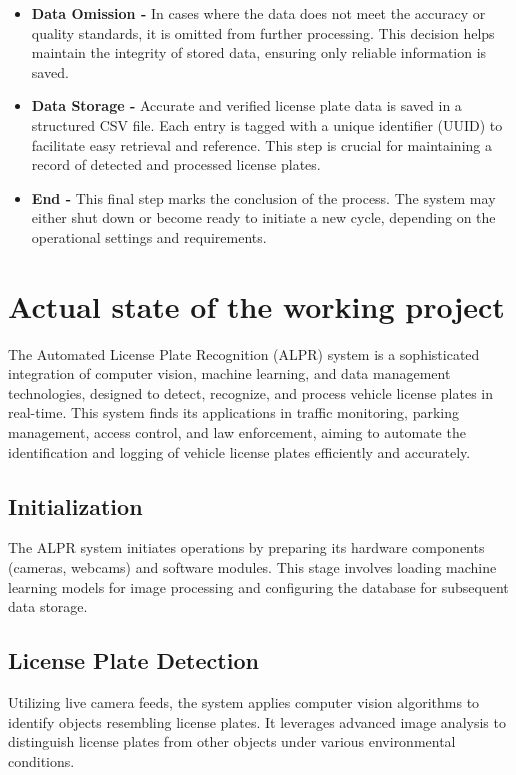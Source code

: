 \begin{itemize}
	\item \textbf{Data Omission -} In cases where the data does not meet the accuracy or quality standards, it is omitted from further processing. This decision helps maintain the integrity of stored data, ensuring only reliable information is saved.
	
	\item \textbf{Data Storage -} Accurate and verified license plate data is saved in a structured CSV file. Each entry is tagged with a unique identifier (UUID) to facilitate easy retrieval and reference. This step is crucial for maintaining a record of detected and processed license plates.
	
	\item \textbf{End -} This final step marks the conclusion of the process. The system may either shut down or become ready to initiate a new cycle, depending on the operational settings and requirements.
\end{itemize}


\section{Actual state of the working project}
The Automated License Plate Recognition (ALPR) system is a sophisticated integration of computer vision, machine learning, and data management technologies, designed to detect, recognize, and process vehicle license plates in real-time. This system finds its applications in traffic monitoring, parking management, access control, and law enforcement, aiming to automate the identification and logging of vehicle license plates efficiently and accurately.

\subsection{Initialization}
The ALPR system initiates operations by preparing its hardware components (cameras, webcams) and software modules. This stage involves loading machine learning models for image processing and configuring the database for subsequent data storage.

\subsection{License Plate Detection}
Utilizing live camera feeds, the system applies computer vision algorithms to identify objects resembling license plates. It leverages advanced image analysis to distinguish license plates from other objects under various environmental conditions.

